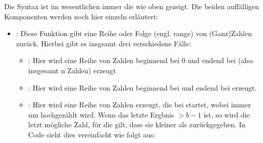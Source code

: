 \documentclass[letterpaper,10pt,english]{jupyterBook}
\begin{document}
\sphinxAtStartPar
Die Syntax ist im wesentlichen immer die wie oben gezeigt. Die beiden auffälligen Komponenten werden noch hier einzeln erläutert:
\begin{itemize}
\item {} 
\sphinxAtStartPar
{}: Diese Funktion gibt eine Reihe oder Folge (engl. range) von (Ganz\sphinxhyphen{})Zahlen zurück. Hierbei gibt es insgsamt drei verschiedene Fälle:
\begin{itemize}
\item {} 
\sphinxAtStartPar
{}: Hier wird eine Reihe von Zahlen beginnend bei 0 und endend bei  (also insgesamt n Zahlen) erzeugt

\item {} 
\sphinxAtStartPar
{}: Hier wird eine Reihe von Zahlen beginnend bei  und endend bei  erzeugt.

\item {} 
\sphinxAtStartPar
{}: Hier wird eine Reihe von Zahlen erzeugt, die bei  startet, wobei immer um  hochgezählt wird. Wenn das letzte Ergbnis \(> b-1\) ist, so wird die letzt mögliche Zahl, für die gilt, dass sie kleiner als  zurückgegeben. In Code sieht dies vereinfacht wie folgt aus:

\end{itemize}

\end{itemize}

\begin{sphinxVerbatim}[commandchars=\\\{\}]
   
      
    
       
          
        
     
\end{sphinxVerbatim}







\renewcommand{\indexname}{Index}
\printindex
\end{document}
